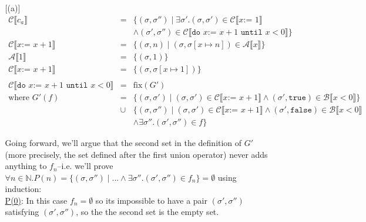 \documentclass[10pt, oneside]{article}
\begin{document}
\begin{enumerate}[1.]
\begin{enumerate} [(a)]
      \begin{eqnarray*}
        \mathcal{C} \llbracket c_a \rrbracket & = & 
          \{(\sigma, \sigma'') \mid \exists \sigma'. 
            (\sigma, \sigma') \in \mathcal{C}\llbracket x\texttt{:= } 1\rrbracket \\
     & & \wedge (\sigma', \sigma'') \in \mathcal{C} \llbracket \texttt{do } x 
                               \texttt{:= } x + 1 \texttt{ until } x < 0 \rrbracket
                                   \} \\
        \mathcal{C} \llbracket x \texttt{:= } x+1 \rrbracket & = & \{(\sigma, n) \mid (\sigma, \sigma[x \mapsto n]) \in \mathcal{A} \llbracket x \rrbracket  \} \\
        \mathcal{A} \llbracket 1 \rrbracket & = & \{(\sigma, 1) \} \\
        \mathcal{C} \llbracket x \texttt{:= } x+1 \rrbracket & = & \{ (\sigma, \sigma[x \mapsto 1]) \} \\
        & & \\
        \mathcal{C} \llbracket \texttt{do } x \texttt{:= } x + 1 \texttt{ until } x < 0 \rrbracket & = & \text{fix}(G') \\
        \text{where } G'(f) & = & \{ (\sigma, \sigma') \mid (\sigma, \sigma') \in \mathcal{C} \llbracket x \texttt{:= } x + 1 \rrbracket \wedge (\sigma', \texttt{true}) \in \mathcal{B} \llbracket x < 0 \rrbracket \} \\
				& \cup & \{ (\sigma, \sigma'') \mid (\sigma, \sigma')  \in \mathcal{C} \llbracket x \texttt{:= } x + 1 \rrbracket \wedge (\sigma', \texttt{false})\in \mathcal{B} \llbracket x < 0 \rrbracket \\
				& & \wedge \exists \sigma''. (\sigma', \sigma'') \in f \}
      \end{eqnarray*}
      
      Going forward, we'll argue that the second set in the definition of $G'$ 
      (more precisely, the set defined after the first union operator) never adds 
      anything to $f_n$--i.e. we'll prove $\forall n \in \mathbb{N}. 
      P(n) = \{ (\sigma, \sigma'') \mid ... \wedge \exists \sigma''. (\sigma', 
      \sigma'') \in f_n \} = \emptyset$ using induction: \\
      
      \underline{P(0)}: In this case $f_n = \emptyset$ so its impossible to have
      a pair $(\sigma', \sigma'')$ satisfying $(\sigma', \sigma'')$, so the the 
      second set is the empty set. \\
      

\end{enumerate}
\end{enumerate}
\end{document}
